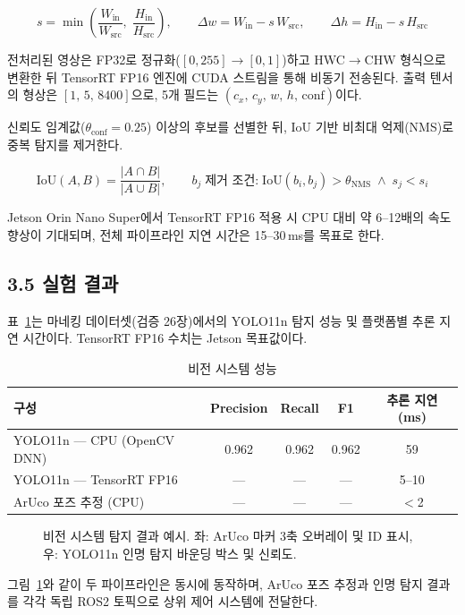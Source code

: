 \documentclass[11pt,a4paper]{article}
\begin{document}
\begin{equation}
  s = \min\!\left(\frac{W_\mathrm{in}}{W_\mathrm{src}},\;
                  \frac{H_\mathrm{in}}{H_\mathrm{src}}\right),
  \qquad
  \Delta w = W_\mathrm{in} - s\,W_\mathrm{src},
  \qquad
  \Delta h = H_\mathrm{in} - s\,H_\mathrm{src}
  \label{eq:letterbox}
\end{equation}

전처리된 영상은 FP32로 정규화($[0,255]\to[0,1]$)하고 HWC$\to$CHW 형식으로
변환한 뒤 TensorRT FP16 엔진에 CUDA 스트림을 통해 비동기 전송된다. 출력
텐서의 형상은 $[1,\,5,\,8400]$으로, 5개 필드는 $(c_x,\,c_y,\,w,\,h,\,\mathrm{conf})$이다.

신뢰도 임계값($\theta_\mathrm{conf}=0.25$) 이상의 후보를 선별한 뒤, IoU 기반
비최대 억제(NMS)로 중복 탐지를 제거한다.

\begin{equation}
  \mathrm{IoU}(A,B) = \frac{|A\cap B|}{|A\cup B|},
  \qquad
  b_j\;\text{제거 조건:}\;\mathrm{IoU}(b_i,b_j)>\theta_\mathrm{NMS}
  \;\wedge\; s_j < s_i
  \label{eq:nms}
\end{equation}

Jetson Orin Nano Super에서 TensorRT FP16 적용 시 CPU 대비 약 6--12배의
속도 향상이 기대되며, 전체 파이프라인 지연 시간은 15--30\,ms를 목표로 한다.

\subsection*{3.5 실험 결과}

표~\ref{tab:perf}는 마네킹 데이터셋(검증 26장)에서의 YOLO11n 탐지 성능 및
플랫폼별 추론 지연 시간이다. TensorRT FP16 수치는 Jetson 목표값이다.

\begin{table}[H]
\centering
\caption{비전 시스템 성능}
\label{tab:perf}
\small
\begin{tabular}{lcccc}
\toprule
\textbf{구성} & \textbf{Precision} & \textbf{Recall} & \textbf{F1} & \textbf{추론 지연 (ms)} \\
\midrule
YOLO11n — CPU (OpenCV DNN)  & 0.962 & 0.962 & 0.962 & 59 \\
YOLO11n — TensorRT FP16     & ---   & ---   & ---   & 5--10 \\
ArUco 포즈 추정 (CPU)        & ---   & ---   & ---   & $<$2   \\
\bottomrule
\end{tabular}
\end{table}

\begin{figure}[H]
\centering
\fbox{\rule{0pt}{4.5cm}\rule{13cm}{0pt}}
\caption{비전 시스템 탐지 결과 예시.
  좌: ArUco 마커 3축 오버레이 및 ID 표시,
  우: YOLO11n 인명 탐지 바운딩 박스 및 신뢰도.}
\label{fig:result}
\end{figure}

그림~\ref{fig:result}와 같이 두 파이프라인은 동시에 동작하며, ArUco 포즈 추정과
인명 탐지 결과를 각각 독립 ROS2 토픽으로 상위 제어 시스템에 전달한다.
\end{document}
